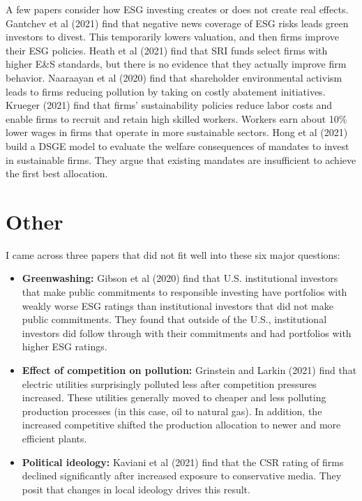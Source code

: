 \documentclass{article}
\begin{document}
A few papers consider how ESG investing creates or does not create real effects.  Gantchev et al (2021) find that negative news coverage of ESG risks leads green investors to divest.  This temporarily lowers valuation, and then firms improve their ESG policies. Heath et al (2021) find that SRI funds select firms with higher E\&S standards, but there is no evidence that they actually improve firm behavior. Naaraayan et al (2020) find that shareholder environmental activism leads to firms reducing pollution by taking on costly abatement initiatives.   Krueger (2021) find that firms' sustainability policies reduce labor costs and enable firms to recruit and retain high skilled workers. Workers earn about 10\% lower wages in firms that operate in more sustainable sectors. Hong et al (2021) build a DSGE model to evaluate the welfare consequences of mandates to invest in sustainable firms. They argue that existing mandates are insufficient to achieve the first best allocation.


\section*{Other}

I came across three papers that did not fit well into these six major questions:

\begin{itemize}
\item \textbf{Greenwashing:} Gibson et al (2020) find that U.S. institutional investors that make public commitments to responsible investing have portfolios with weakly worse ESG ratings than institutional investors that did not make public commitments.  They found that outside of the U.S., institutional investors did follow through with their commitments and had portfolios with higher ESG ratings.

\item \textbf{Effect of competition on pollution:} Grinstein and Larkin (2021) find that electric utilities surprisingly polluted less after competition pressures increased. These utilities generally moved to cheaper and less polluting production processes (in this case, oil to natural gas).  In addition, the increased competitive shifted the production allocation to newer and more efficient plants.

\item \textbf{Political ideology:} Kaviani et al (2021) find that the CSR rating of firms declined significantly after increased exposure to conservative media. They posit that changes in local ideology drives this result.
\end{itemize}
\end{document}
